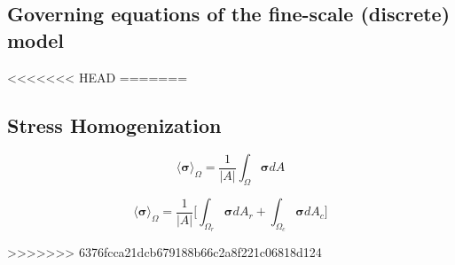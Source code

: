 \subsection{Governing equations of the fine-scale (discrete) model}

<<<<<<< HEAD
=======
\subsection{Stress Homogenization}

\begin{equation}
\label{eqn:stressav}
\langle \boldsymbol{\sigma} \rangle_\Omega = \frac{1}{\vert A \vert} \int_\Omega \boldsymbol{\sigma} { dA}
\end{equation}

\begin{equation}
\label{eqn:stresssplit}
\langle \boldsymbol{\sigma} \rangle_\Omega = \frac{1}{\vert A \vert} \bigg \lbrack {\int_{\Omega_{r}} \boldsymbol{\sigma} { dA_r} + \int_{\Omega_{c}} \boldsymbol{\sigma} { dA_c}} \bigg \rbrack
\end{equation}

>>>>>>> 6376fcca21dcb679188b66c2a8f221c06818d124
